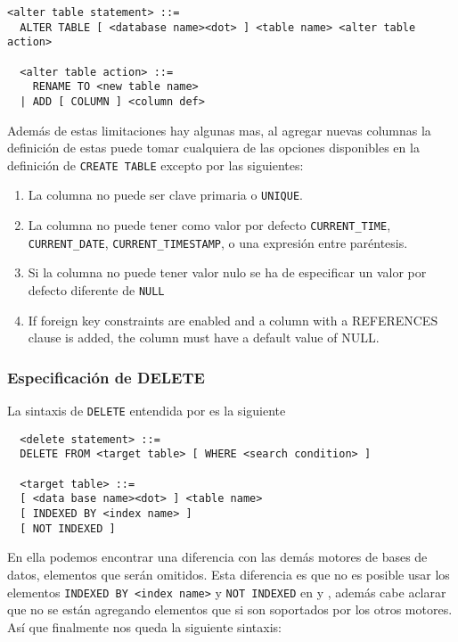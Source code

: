 %  
\begin{Verbatim}[frame=single, label=sintaxis para ALTER TABLE]
<alter table statement> ::= 
  ALTER TABLE [ <database name><dot> ] <table name> <alter table action>
  
  <alter table action> ::=
    RENAME TO <new table name>
  | ADD [ COLUMN ] <column def>
\end{Verbatim}

Además de estas limitaciones hay algunas mas, al agregar nuevas columnas la definición de estas puede tomar cualquiera de las opciones disponibles en la definición de \verb=CREATE TABLE= excepto por las siguientes:

\begin{enumerate}

\item La columna no puede ser clave primaria o \verb=UNIQUE=.

\item La columna no puede tener como valor por defecto \verb=CURRENT_TIME=, \verb=CURRENT_DATE=, \verb=CURRENT_TIMESTAMP=, o una expresión entre paréntesis.

\item Si la columna no puede tener valor nulo se ha de especificar un valor por defecto diferente de \verb=NULL=

\item If foreign key constraints are enabled and a column with a REFERENCES clause is added, the column must have a default value of NULL.

\end{enumerate}



\subsubsection{Especificación de DELETE} 
\label{especificacion:dialectos:delete}
La sintaxis de \verb=DELETE= entendida por \s es la siguiente
\begin{Verbatim}
  <delete statement> ::=
  DELETE FROM <target table> [ WHERE <search condition> ]

  <target table> ::=
  [ <data base name><dot> ] <table name>
  [ INDEXED BY <index name> ]
  [ NOT INDEXED ]
\end{Verbatim}
En ella podemos encontrar una diferencia con las demás motores de bases de datos, elementos que serán omitidos. Esta diferencia es que no es posible usar los elementos \verb=INDEXED BY <index name>= y \verb=NOT INDEXED= en \p y \m, además cabe aclarar que no se están agregando elementos que si son soportados por los otros motores. Así que finalmente nos queda la siguiente sintaxis:


